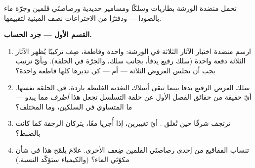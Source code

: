 \begin{problem}\label{pb:g8:electric-current-effects:1}
تحمل منضدة الورشة بطاريات وسلكًا ومسامير حديدية 
ورصاصتَي قلمين وجرّة ماء بالصودا --- ودفترًا من الاختراعات
نصف المبنية لتقييمها.

\medskip\noindent\textbf{القسم الأول --- جرد الحساب.}
\begin{enumerate}
  \item ارسم منضدة اختبار الآثار الثلاثة في الورشة: 
        واحدة وقاطعة، صِف تركيبًا يُظهر الآثار الثلاثة دفعة
        واحدة (سلك رفيع يدفأ،  بجانب سلك، والجرّة في
        الحلقة). وبأيّ ترتيب يجب أن تجلس العروض الثلاثة ---
         أم  --- كي تديرها كلها قاطعة
        واحدة؟
  \item سلك العرض الرفيع يدفأ بينما تبقى أسلاك التغذية
        الغليظة باردة، في الحلقة نفسها. أيّ حقيقة من حقائق
        الفصل الأول عن حلقة التسلسل تجعل هذا \emph{أطرف} مما
        يبدو --- ما المتساوي في السلكين، وما المختلف؟
  \item ترتجف  شرقًا حين تُغلق . أيّ تغييرين،
        إذا أُجريا معًا، يتركان الرجفة كما كانت بالضبط؟
  \item تنساب الفقاقيع من إحدى رصاصتَي القلمين  ضِعف
        الأخرى. علامَ يلمّح هذا في شأن مكوّنَي الماء؟
        (والكيمياء ستؤكّد النسبة.)
\end{enumerate}


\end{problem}
